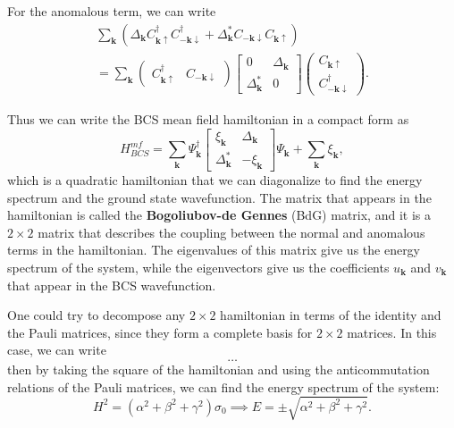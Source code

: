For the anomalous term, we can write
\[
    \begin{aligned}
        \sum_{\mathbf{k}} (\Delta_{\mathbf{k}} C^{\dagger}_{\mathbf{k} \uparrow} C^{\dagger}_{-\mathbf{k} \downarrow} + \Delta_{\mathbf{k}}^* C_{-\mathbf{k} \downarrow} C_{\mathbf{k} \uparrow}) \\
        = \sum_{\mathbf{k}} \begin{pmatrix}
                                C^{\dagger}_{\mathbf{k} \uparrow} & C_{-\mathbf{k} \downarrow}
                            \end{pmatrix} \begin{bmatrix}
                                              0                     & \Delta_{\mathbf{k}} \\
                                              \Delta_{\mathbf{k}}^* & 0
                                          \end{bmatrix} \begin{pmatrix}
                                                            C_{\mathbf{k} \uparrow} \\
                                                            C^{\dagger}_{-\mathbf{k} \downarrow}
                                                        \end{pmatrix}.
    \end{aligned}
\]

Thus we can write the BCS mean field hamiltonian in a compact form as
\[
    H_{BCS}^{mf} = \sum_{\mathbf{k}} \Psi_{\mathbf{k}}^\dagger \begin{bmatrix}
        \xi_{\mathbf{k}}      & \Delta_{\mathbf{k}} \\
        \Delta_{\mathbf{k}}^* & -\xi_{\mathbf{k}}
    \end{bmatrix} \Psi_{\mathbf{k}} + \sum_{\mathbf{k}} \xi_{\mathbf{k}},
\]
which is a quadratic hamiltonian that we can diagonalize to find the energy spectrum and the ground state wavefunction. The matrix that appears in the hamiltonian is called the \textbf{Bogoliubov-de Gennes} (BdG) matrix, and it is a \(2 \times 2\) matrix that describes the coupling between the normal and anomalous terms in the hamiltonian. The eigenvalues of this matrix give us the energy spectrum of the system, while the eigenvectors give us the coefficients \(u_{\mathbf{k}}\) and \(v_{\mathbf{k}}\) that appear in the BCS wavefunction.

\begin{remark}
    One could try to decompose any \(2\times 2\) hamiltonian in terms of the identity and the Pauli matrices, since they form a complete basis for \(2\times 2\) matrices. In this case, we can write
    \[
        \dots
    \]
    then by taking the square of the hamiltonian and using the anticommutation relations of the Pauli matrices, we can find the energy spectrum of the system:
    \[
        H^2 = (\alpha^2 + \beta^2 + \gamma^2) \sigma_0 \implies E = \pm \sqrt{\alpha^2 + \beta^2 + \gamma^2}.
    \]
\end{remark}

